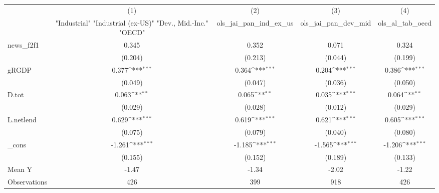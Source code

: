 {
\def\sym#1{\ifmmode^{#1}\else\(^{#1}\)\fi}
\begin{tabular}{l*{4}{c}}
\toprule
            &\multicolumn{1}{c}{(1)}&\multicolumn{1}{c}{(2)}&\multicolumn{1}{c}{(3)}&\multicolumn{1}{c}{(4)}\\
            &\multicolumn{1}{c}{ "Industrial" "Industrial (ex-US)" "Dev., Mid.-Inc." "OECD" }&\multicolumn{1}{c}{ols\_jai\_pan\_ind\_ex\_us}&\multicolumn{1}{c}{ols\_jai\_pan\_dev\_mid}&\multicolumn{1}{c}{ols\_al\_tab\_oecd}\\
\midrule
news\_f2f1   &       0.345         &       0.352         &       0.071         &       0.324         \\
            &     (0.204)         &     (0.213)         &     (0.044)         &     (0.199)         \\
\addlinespace
gRGDP       &       0.377\sym{***}&       0.364\sym{***}&       0.204\sym{***}&       0.386\sym{***}\\
            &     (0.049)         &     (0.047)         &     (0.036)         &     (0.050)         \\
\addlinespace
D.tot       &       0.063\sym{**} &       0.065\sym{**} &       0.035\sym{***}&       0.064\sym{**} \\
            &     (0.029)         &     (0.028)         &     (0.012)         &     (0.029)         \\
\addlinespace
L.netlend   &       0.629\sym{***}&       0.619\sym{***}&       0.621\sym{***}&       0.605\sym{***}\\
            &     (0.075)         &     (0.079)         &     (0.040)         &     (0.080)         \\
\addlinespace
\_cons      &      -1.261\sym{***}&      -1.185\sym{***}&      -1.565\sym{***}&      -1.206\sym{***}\\
            &     (0.155)         &     (0.152)         &     (0.189)         &     (0.133)         \\
\midrule
Mean Y      &       -1.47         &       -1.34         &       -2.02         &       -1.22         \\
Observations&         426         &         399         &         918         &         426         \\
\bottomrule
\end{tabular}
}
